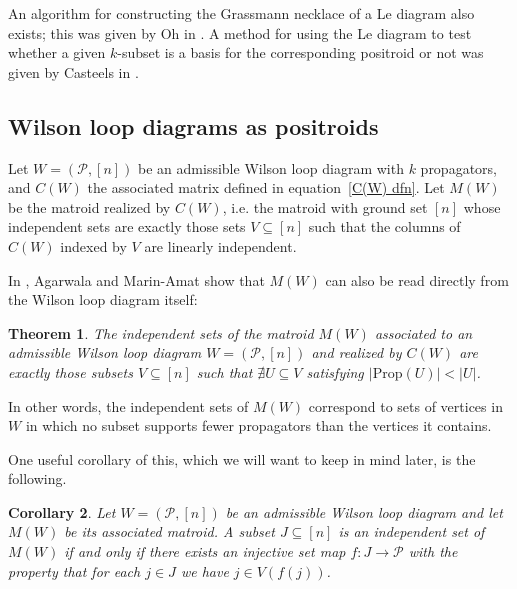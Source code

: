 \documentclass[11pt]{article}
\newcommand{\cP}{\mathcal{P}}
\newcommand{\Prop}{\textrm{Prop}}
\newtheorem{thm}{Theorem}[section]
\newtheorem{cor}[thm]{Corollary}
\theoremstyle{remark}
\theoremstyle{definition}
\begin{document}
An algorithm for constructing the Grassmann necklace of a Le diagram also exists; this was given by Oh in \cite{Oh}. A method for using the Le diagram to test whether a given $k$-subset is a basis for the corresponding positroid or not was given by Casteels in \cite{CasteelsPaths}.



\subsection{Wilson loop diagrams as positroids}\label{sec:WLD as positroids}


Let $W = (\cP,[n])$ be an admissible Wilson loop diagram with $k$ propagators, and $C(W)$ the associated matrix defined in equation~\eqref{C(W) dfn}. Let $M(W)$ be the matroid realized by $C(W)$, i.e. the matroid with ground set $[n]$ whose independent sets are exactly those sets $V \subseteq [n]$ such that the columns of $C(W)$ indexed by $V$ are linearly independent.

In \cite{wilsonloop}, Agarwala and Marin-Amat show that $M(W)$ can also be read directly from the Wilson loop diagram itself:

\begin{thm} \label{thm WLD defines matroid} \cite[Theorem 3.6]{wilsonloop} The independent sets of the matroid $M(W)$ associated to an admissible Wilson loop diagram $W = (\cP,[n])$ and realized by $C(W)$ are exactly those subsets $V \subseteq [n]$ such that $\nexists U\subseteq V$ satisfying $|\Prop(U)| < |U|$. \end{thm}
In other words, the independent sets of $M(W)$ correspond to sets of vertices in $W$ in which no subset supports fewer propagators than the vertices it contains.

One useful corollary of this, which we will want to keep in mind later, is the following.
\begin{cor}\label{lem basis as perm}
Let $W = (\cP,[n])$ be an admissible Wilson loop diagram and let $M(W)$ be its associated matroid. A subset $J \subseteq [n]$ is an independent set of $M(W)$ if and only if there exists an injective set map $f : J \rightarrow \cP$ with the property that for each $j\in J$ we have $j \in V(f(j))$.
\end{cor}
\end{document}
